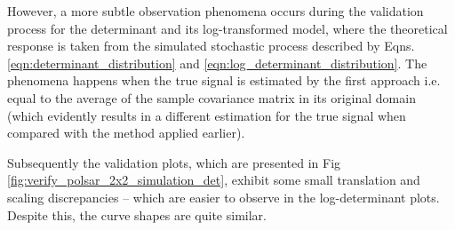 \documentclass[journal]{IEEEtran}
\begin{document}
However, a more subtle observation phenomena occurs during the validation process for the determinant and its log-transformed model,
  where the theoretical response is taken from the simulated stochastic process described by Eqns. \ref{eqn:determinant_distribution} and \ref{eqn:log_determinant_distribution}.
The phenomena happens when the true signal is estimated by the first approach i.e. equal to the average of the sample covariance matrix in its original domain (which evidently results in a different estimation for the true signal when compared with the method applied earlier).

Subsequently the validation plots, which are presented in Fig \ref{fig:verify_polsar_2x2_simulation_det}, exhibit some small translation and scaling discrepancies -- which are
 easier to observe in the log-determinant plots. Despite this, the curve shapes are quite similar.
\end{document}
